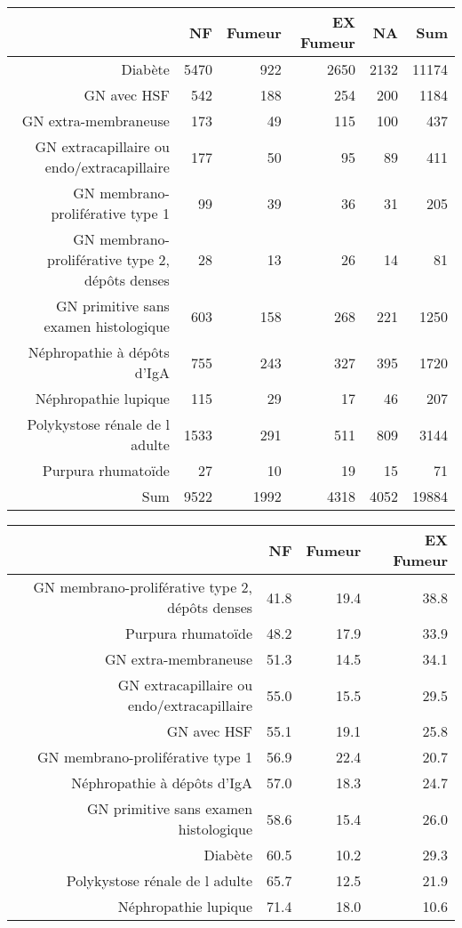\documentclass[11pt,a4paper]{article}\usepackage[]{graphicx}\usepackage[]{color}
\begin{document}
\begin{table}[H]
\centering
\begin{tabular}{rrrrrr}
  \hline
 & NF & Fumeur & EX Fumeur & NA & Sum \\ 
  \hline
Diabète & 5470 & 922 & 2650 & 2132 & 11174 \\ 
  GN avec HSF & 542 & 188 & 254 & 200 & 1184 \\ 
  GN extra-membraneuse & 173 & 49 & 115 & 100 & 437 \\ 
  GN extracapillaire ou endo/extracapillaire & 177 & 50 & 95 & 89 & 411 \\ 
  GN membrano-proliférative type 1 & 99 & 39 & 36 & 31 & 205 \\ 
  GN membrano-proliférative type 2, dépôts denses & 28 & 13 & 26 & 14 & 81 \\ 
  GN primitive sans examen histologique & 603 & 158 & 268 & 221 & 1250 \\ 
  Néphropathie à dépôts d'IgA & 755 & 243 & 327 & 395 & 1720 \\ 
  Néphropathie lupique & 115 & 29 & 17 & 46 & 207 \\ 
  Polykystose rénale de l adulte & 1533 & 291 & 511 & 809 & 3144 \\ 
  Purpura rhumatoïde & 27 & 10 & 19 & 15 & 71 \\ 
  Sum & 9522 & 1992 & 4318 & 4052 & 19884 \\ 
   \hline
\end{tabular}
\end{table}
\begin{table}[H]
\centering
\begin{tabular}{rrrr}
  \hline
 & NF & Fumeur & EX Fumeur \\ 
  \hline
GN membrano-proliférative type 2, dépôts denses & 41.8 & 19.4 & 38.8 \\ 
  Purpura rhumatoïde & 48.2 & 17.9 & 33.9 \\ 
  GN extra-membraneuse & 51.3 & 14.5 & 34.1 \\ 
  GN extracapillaire ou endo/extracapillaire & 55.0 & 15.5 & 29.5 \\ 
  GN avec HSF & 55.1 & 19.1 & 25.8 \\ 
  GN membrano-proliférative type 1 & 56.9 & 22.4 & 20.7 \\ 
  Néphropathie à dépôts d'IgA & 57.0 & 18.3 & 24.7 \\ 
  GN primitive sans examen histologique & 58.6 & 15.4 & 26.0 \\ 
  Diabète & 60.5 & 10.2 & 29.3 \\ 
  Polykystose rénale de l adulte & 65.7 & 12.5 & 21.9 \\ 
  Néphropathie lupique & 71.4 & 18.0 & 10.6 \\ 
   \hline
\end{tabular}
\end{table}
\end{document}
